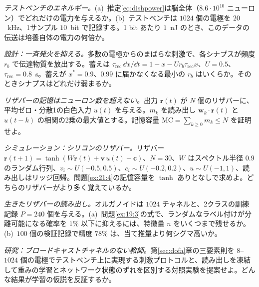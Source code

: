\begin{exercise}[\lvlA]
\label{ex:21:2}
\emph{テストベンチのエネルギー。}(a)~推定\eqref{eq:dishpower}は脳全体（$8.6\cdot10^{10}$ ニューロン）でどれだけの電力を与えるか。(b)~テストベンチは $1024$ 個の電極を $20$~kHz、1サンプル $10$~bit で記録する。1 bit あたり $1$~nJ のとき、このデータの伝送は培養自体の電力の何倍か。
\end{exercise}

\begin{exercise}[\lvlB]
\label{ex:21:3}
\emph{設計：一斉発火を抑える。}多数の電極からのまばらな刺激で、各シナプスが頻度 $r_b$ で伝達物質を放出する。蓄えは $\tau_{\text{rec}}\,\dd x/\dd t=1-x-Ur_b\tau_{\text{rec}}x$、$U=0.5$、$\tau_{\text{rec}}=0.8$~s。蓄えが $x^*=0.9$、$0.99$ に届かなくなる最小の $r_b$ はいくらか。そのときシナプスはどれだけ弱まるか。
\end{exercise}

\begin{exercise}[\lvlB]
\label{ex:21:4}
\emph{リザバーの記憶はニューロン数を超えない。}出力 $\mathbf r(t)$ が $N$ 個のリザバーに、平均ゼロ・分散1の白色入力 $u(t)$ を与える。$m_k$ を読み出し $\mathbf w_k\cdot\mathbf r(t)$ と $u(t-k)$ の相関の2乗の最大値とする。記憶容量 $\mathrm{MC}=\sum_{k\ge0}m_k\le N$ を証明せよ。
\end{exercise}

\begin{exercise}[\lvlB]
\label{ex:21:5}
\emph{シミュレーション：シリコンのリザバー。}リザバー $\mathbf r(t+1)=\tanh(W\mathbf r(t)+\mathbf v\,u(t)+\mathbf c)$、$N=30$、$W$ はスペクトル半径 $0.9$ のランダム行列、$v_i\sim U(-0.5,0.5)$、$c_i\sim U(-0.2,0.2)$、$u\sim U(-1,1)$、読み出しはリッジ回帰。問題\ref{ex:21:4}の記憶容量を $\tanh$ ありとなしで求めよ。どちらのリザバーがより多く覚えているか。
\end{exercise}

\begin{exercise}[\lvlB]
\label{ex:21:6}
\emph{生きたリザバーの読み出し。}オルガノイドは $1024$ チャネルと、2クラスの訓練記録 $P=240$ 個を与える。(a)~問題\ref{ex:19:3}の式で、ランダムなラベル付けが分離可能になる確率を $1\%$ 以下に抑えるには、特徴量 $n$ をいくつまで残せるか。(b)~$100$ 個の検証記録で精度 $78\%$ は、当て推量より何シグマ高いか。
\end{exercise}

\begin{exercise}[\lvlC]
\label{ex:21:7}
\emph{研究：ブロードキャストチャネルのない教師。}第\ref{sec:dofa}章の三要素則を $8$--$1024$ 個の電極でテストベンチ上に実現する刺激プロトコルと、読み出しを凍結して重みの学習とネットワーク状態のずれを区別する対照実験を提案せよ。どんな結果が学習の仮説を反証するか。
\end{exercise}
